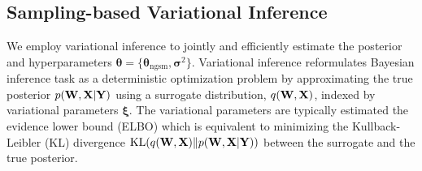 \subsection{Sampling-based Variational Inference} 
\label{subsec:scalable_VI}  
\vspace{-0.02in}
We employ variational inference \citep{blei2017variational} to jointly and efficiently estimate the posterior and hyperparameters \(\boldsymbol{\theta} = \{\boldsymbol{\theta}_{\text{ngsm}}, \bm \sigma^2\}\). %
Variational inference reformulates Bayesian inference task as a deterministic optimization problem by approximating the true posterior $p({\mathbf W}, {\mathbf X} \vert {\mathbf Y})$ using a surrogate distribution, %
$q({\mathbf W}, {\mathbf X})$, indexed by variational parameters $\bm \xi$. The variational parameters are typically estimated  the evidence lower bound (\MakeUppercase{elbo}) which is equivalent to minimizing the \MakeUppercase{k}ullback-\MakeUppercase{l}eibler (\MakeUppercase{kl}) divergence \(\mathrm{KL}(q({\mathbf W}, {\mathbf X}) \| p({\mathbf W}, {\mathbf X} \vert {\mathbf Y}))\) between the surrogate and the true posterior. 

